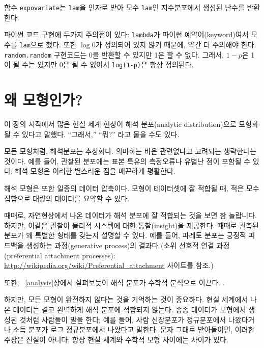 함수 {\tt expovariate}는 {\tt lam}을 인자로 받아
모수 {\tt lam}인 지수분포에서 생성된 난수를 반환한다.

파이썬 코드 구현에 두가지 주의점이 있다: 
\verb"lambda"가 파이썬 예약어(keyword)여서 모수를 \verb"lam"으로 했다. 또한 $\log 0$가 정의되어 있지 않기 때문에, 약간 더 주의해야 한다.
{\tt random.random} 구현코드는 0을 반환할 수 있지만 1은 할 수 없다.
그래서, $1 - p$은 1이 될 수는 있지만 0은 될 수 없어서 {\tt log(1-p)}은 항상 정의된다. 


\section{왜 모형인가?}

이 장의 시작에서 많은 현실 세계 현상이 해석 분포(analytic distribution)으로 모형화 될 수 있다고 말했다.
``그래서,'' ``뭐?'' 라고 물을 수도 있다.

모든 모형처럼, 해석분포는 추상화다. 의마하는 바은 관련없다고 고려되는 생략한다는 것이다. 예를 들어, 관찰된 분포에는 표본 특유의 측정오류나 유별난 점이 포함될 수 있다; 해석 모형은 이러한 별스러운 점을 매끈하게 평활한다.

해석 모형은 또한 일종의 데이터 압축이다. 모형이 테이터셋에 잘 적합될 때, 적은 모수 집합으로 대량의 데이터를 요약할 수 있다.

때때로, 자연현상에서 나온 데이터가 해석 분포에 잘 적합되는 것을 보면 참 놀랍니다. 하지만, 이같은 관찰이 물리적 시스템에 대한 통찰(insight)을 제공한다.
때때로 관측된 분포가 왜 특별한 형태를 갖는지 설명할 수 있다.
예를 들어, 파레토 분포는 긍정적 피드백을 생성하는 과정(generative process)의 결과다 (소위 선호적 연결 과정 (preferential attachment processes): \url{http://wikipedia.org/wiki/Preferential_attachment} 사이트를 참조.)

또한, ~\ref{analysis}장에서 살펴보듯이 해석 분포가 수학적 분석으로 이끈다. .

하지만, 모든 모형이 완전하지 않다는 것을 기억하는 것이 중요하다.
현실 세계에서 나온 데이터는 결코 완벽하게 해석 분포에 적합되지 않는다. 종종 데이터가 모형에서 생성된 것처럼 사람들이 말을 한다; 예를 들어, 사람 신장분포가 정규분포에서 나왔다거나 소득 분포가 로그 정규분포에서 나왔다고 말한다. 문자 그대로 받아들이면, 이러한 주장은 진실이 아니다; 항상 현실 세계와 수학적 모형 사이에는 차이가 있다.

